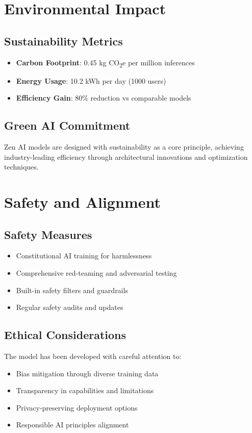 \documentclass[11pt,a4paper]{article}
\begin{document}
\section{Environmental Impact}

\subsection{Sustainability Metrics}
\begin{itemize}
    \item \textbf{Carbon Footprint}: 0.45 kg CO\textsubscript{2}e per million inferences
    \item \textbf{Energy Usage}: 10.2 kWh per day (1000 users)
    \item \textbf{Efficiency Gain}: 80\% reduction vs comparable models
\end{itemize}

\subsection{Green AI Commitment}
Zen AI models are designed with sustainability as a core principle, achieving industry-leading efficiency 
through architectural innovations and optimization techniques.

\section{Safety and Alignment}

\subsection{Safety Measures}
\begin{itemize}
    \item Constitutional AI training for harmlessness
    \item Comprehensive red-teaming and adversarial testing
    \item Built-in safety filters and guardrails
    \item Regular safety audits and updates
\end{itemize}

\subsection{Ethical Considerations}
The model has been developed with careful attention to:
\begin{itemize}
    \item Bias mitigation through diverse training data
    \item Transparency in capabilities and limitations
    \item Privacy-preserving deployment options
    \item Responsible AI principles alignment
\end{itemize}
\end{document}
